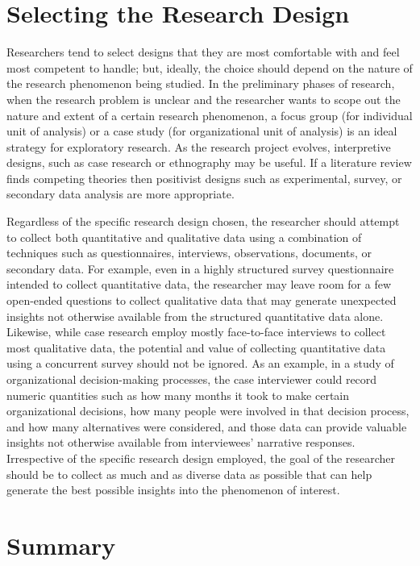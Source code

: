 \section{Selecting the Research Design}

Researchers tend to select designs that they are most comfortable with and feel most competent to handle; but, ideally, the choice should depend on the nature of the research phenomenon being studied. In the preliminary phases of research, when the research problem is unclear and the researcher wants to scope out the nature and extent of a certain research phenomenon, a focus group (for individual unit of analysis) or a case study (for organizational unit of analysis) is an ideal strategy for exploratory research. As the research project evolves, interpretive designs, such as case research or ethnography may be useful. If a literature review finds competing theories then positivist designs such as experimental, survey, or secondary data analysis are more appropriate.

Regardless of the specific research design chosen, the researcher should attempt to collect both quantitative and qualitative data using a combination of techniques such as questionnaires, interviews, observations, documents, or secondary data. For example, even in a highly structured survey questionnaire intended to collect quantitative data, the researcher may leave room for a few open-ended questions to collect qualitative data that may generate unexpected insights not otherwise available from the structured quantitative data alone. Likewise, while case research employ mostly face-to-face interviews to collect most qualitative data, the potential and value of collecting quantitative data using a concurrent survey should not be ignored. As an example, in a study of organizational decision-making processes, the case interviewer could record numeric quantities such as how many months it took to make certain organizational decisions, how many people were involved in that decision process, and how many alternatives were considered, and those data can provide valuable insights not otherwise available from interviewees' narrative responses. Irrespective of the specific research design employed, the goal of the researcher should be to collect as much and as diverse data as possible that can help generate the best possible insights into the phenomenon of interest.

\section{Summary}\label{ch05:summary}

